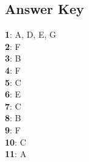 \documentclass{exam}
\begin{document}
\begin{questions}
\newpage
\section*{Answer Key}
    \textbf{1}: A, D, E, G \\
    \textbf{2}: F \\
    \textbf{3}: B \\
    \textbf{4}: F \\
    \textbf{5}: C \\
    \textbf{6}: E \\
    \textbf{7}: C \\
    \textbf{8}: B \\
    \textbf{9}: F \\
    \textbf{10}: C \\
    \textbf{11}: A \\
    
\end{questions}
\end{document}
